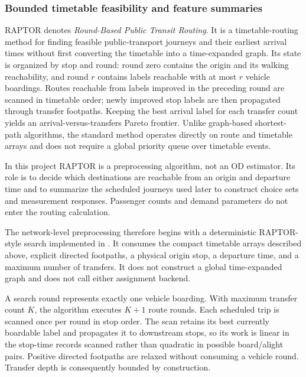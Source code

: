 \subsubsection{Bounded timetable feasibility and feature summaries}
\label{sec:reduced-od-raptor}

RAPTOR denotes \emph{Round-Based Public Transit Routing}.  It is a
timetable-routing method for finding feasible public-transport journeys and
their earliest arrival times without first converting the timetable into a
time-expanded graph.  Its state is organized by stop and round: round zero
contains the origin and its walking reachability, and round $r$ contains labels
reachable with at most $r$ vehicle boardings.  Routes reachable from labels
improved in the preceding round are scanned in timetable order; newly improved
stop labels are then propagated through transfer footpaths.  Keeping the best
arrival label for each transfer count yields an arrival-versus-transfers Pareto
frontier.  Unlike graph-based shortest-path algorithms, the standard method
operates directly on route and timetable arrays and does not require a global
priority queue over timetable events.

In this project RAPTOR is a preprocessing algorithm, not an OD estimator.  Its
role is to decide which destinations are reachable from an origin and departure
time and to summarize the scheduled journeys used later to construct choice
sets and measurement responses.  Passenger counts and demand parameters do not
enter the routing calculation.

The network-level preprocessing therefore begins with a deterministic
RAPTOR-style search implemented in
.  It consumes the
compact timetable arrays described above, explicit directed footpaths, a
physical origin stop, a departure time, and a maximum number of transfers.  It
does not construct a global time-expanded graph and does not call either
assignment backend.

A search round represents exactly one vehicle boarding.  With maximum transfer
count $K$, the algorithm executes $K+1$ route rounds.  Each scheduled trip is
scanned once per round in stop order.  The scan retains its best currently
boardable label and propagates it to downstream stops, so its work is linear in
the stop-time records scanned rather than quadratic in possible board/alight
pairs.  Positive directed footpaths are relaxed without consuming a vehicle
round.  Transfer depth is consequently bounded by construction.


